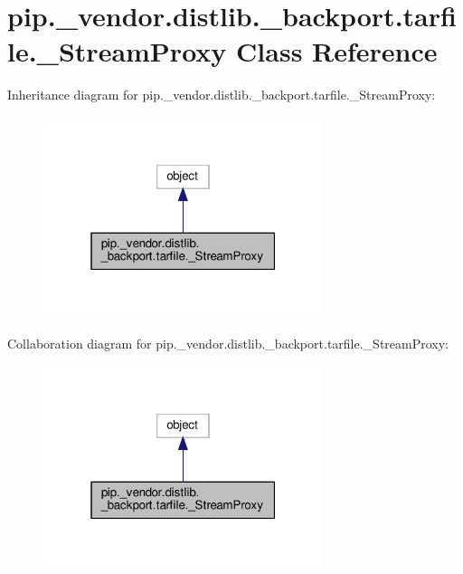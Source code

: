 \hypertarget{classpip_1_1__vendor_1_1distlib_1_1__backport_1_1tarfile_1_1__StreamProxy}{}\section{pip.\+\_\+vendor.\+distlib.\+\_\+backport.\+tarfile.\+\_\+\+Stream\+Proxy Class Reference}
\label{classpip_1_1__vendor_1_1distlib_1_1__backport_1_1tarfile_1_1__StreamProxy}


Inheritance diagram for pip.\+\_\+vendor.\+distlib.\+\_\+backport.\+tarfile.\+\_\+\+Stream\+Proxy\+:
\nopagebreak
\begin{figure}[H]
\begin{center}
\leavevmode
\includegraphics[width=232pt]{classpip_1_1__vendor_1_1distlib_1_1__backport_1_1tarfile_1_1__StreamProxy__inherit__graph}
\end{center}
\end{figure}


Collaboration diagram for pip.\+\_\+vendor.\+distlib.\+\_\+backport.\+tarfile.\+\_\+\+Stream\+Proxy\+:
\nopagebreak
\begin{figure}[H]
\begin{center}
\leavevmode
\includegraphics[width=232pt]{classpip_1_1__vendor_1_1distlib_1_1__backport_1_1tarfile_1_1__StreamProxy__coll__graph}
\end{center}
\end{figure}
